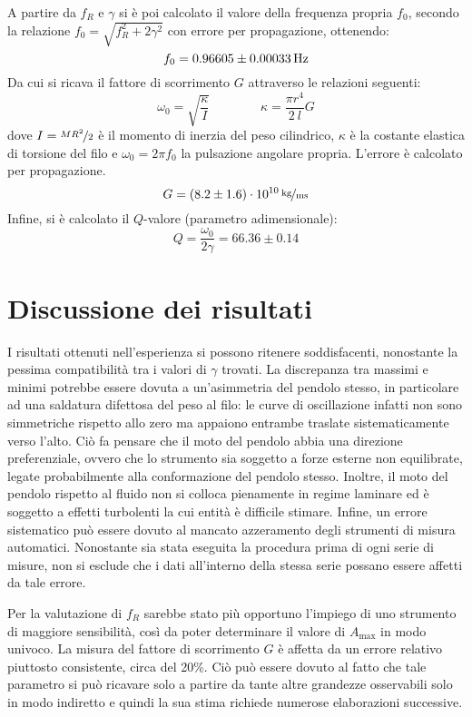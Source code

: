 \documentclass[italian,a4paper]{article}
\begin{document}
A partire da $f_R$ e $\gamma$ si è poi calcolato il valore della frequenza propria $f_0$, secondo la relazione $f_0=\sqrt{f_R^2+2\gamma^2}$ con errore per propagazione, ottenendo:
\begin{equation*}
f_0 = \unit[0.96605 \pm 0.00033]{Hz}
\end{equation*}
Da cui si ricava il fattore di scorrimento $G$ attraverso le relazioni seguenti:
\begin{equation*}
\omega_0 = \sqrt{\dfrac{\kappa}{I}} \qquad\qquad \kappa=\dfrac{\pi r^4}{2\: l}G
\end{equation*}
 dove $I=\nicefrac{MR^2}{2}$ è il momento di inerzia del peso cilindrico, $\kappa$ è la costante elastica di torsione del filo e $\omega_0=2\pi f_0$ la pulsazione angolare propria. L'errore è calcolato per propagazione.
\begin{equation*}
G = \unitfrac[(8.2 \pm 1.6)\cdot 10^{10}]{kg}{ms}
\end{equation*}
Infine, si è calcolato il $Q$-valore (parametro adimensionale):
\begin{equation*}
 Q=\dfrac{\omega_0}{2\gamma} = 66.36 \pm 0.14
\end{equation*}
\section{Discussione dei risultati}
I risultati ottenuti nell'esperienza si possono ritenere soddisfacenti, nonostante la pessima compatibilità tra i valori di $\gamma$ trovati. La discrepanza tra massimi e minimi potrebbe essere dovuta a un'asimmetria del pendolo stesso, in particolare ad una saldatura difettosa del peso al filo: le curve di oscillazione infatti non sono simmetriche rispetto allo zero ma appaiono entrambe traslate sistematicamente verso l'alto. Ciò fa pensare che il moto del pendolo abbia una direzione preferenziale, ovvero che lo strumento sia soggetto a forze esterne non equilibrate, legate probabilmente alla conformazione del pendolo stesso. Inoltre, il moto del pendolo rispetto al fluido non si colloca pienamente in regime laminare ed è soggetto a effetti turbolenti la cui entità è difficile stimare. Infine, un errore sistematico può essere dovuto al mancato azzeramento degli strumenti di misura automatici. Nonostante sia stata eseguita la procedura prima di ogni serie di misure, non si esclude che i dati all'interno della stessa serie possano essere affetti da tale errore.

Per la valutazione di $f_R$ sarebbe stato più opportuno l'impiego di uno strumento di maggiore sensibilità, così da poter determinare il valore di $A_{\max}$ in modo univoco. La misura del fattore di scorrimento $G$ è affetta da un errore relativo piuttosto consistente, circa del 20\%. Ciò può essere dovuto al fatto che tale parametro si può ricavare solo a partire da tante altre grandezze osservabili solo in modo indiretto e quindi la sua stima richiede numerose elaborazioni successive.
\end{document}
